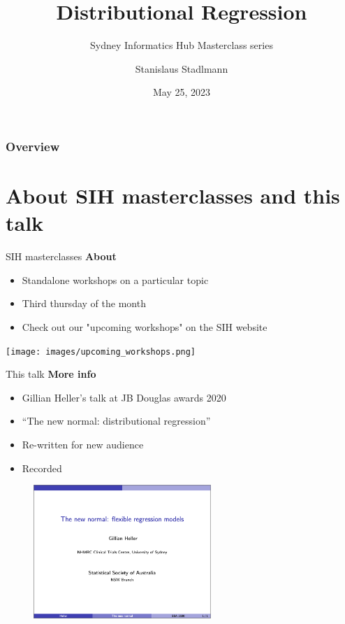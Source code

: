 \documentclass[t]{beamer} 	%
\title{Distributional Regression}
\subtitle{Sydney Informatics Hub Masterclass series} %
\author{Stanislaus Stadlmann}
\institute{Sydney Informatics Hub}
\date{May 25, 2023} %
\begin{document}
	

\begin{frame}
	\titlepage
\end{frame}


\begin{frame}
	\frametitle{Overview} %
	\tableofcontents 
\end{frame}

\section{About SIH masterclasses and this talk}

\begin{frame}{SIH masterclasses}
	\textbf{About}
	\begin{itemize}
		\item Standalone workshops on a particular topic
		\item Third thursday of the month
		\item Check out our "upcoming workshops" on the SIH website
	\end{itemize}
	\texttt{[image: images/upcoming\_workshops.png]}
\end{frame}

\begin{frame}{This talk}
	\textbf{More info}
	\begin{itemize}
		\item Gillian Heller's talk at JB Douglas awards 2020
		\item ``The new normal: distributional regression''
		\item Re-written for new audience
		\item Recorded
	\end{itemize}
	\begin{figure}
		\centering
		\includegraphics[width=0.6\textwidth]{images/gillian_talk.png}
	\end{figure}
\end{frame}
\end{document}
